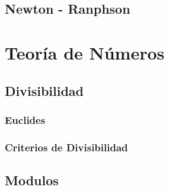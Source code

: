 \documentclass[12pt, fleqn]{report}                             %
\theoremstyle{break}                                            %
\begin{document}
        \section{Newton - Ranphson}


    
    \clearpage
    \chapter{Teoría de Números}

        \section{Divisibilidad}

            \subsection{Euclides}

            \subsection{Criterios de Divisibilidad}

        \section{Modulos}

\end{document}
